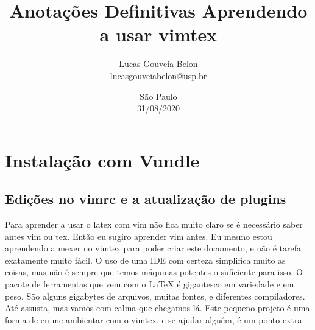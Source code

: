 \documentclass[a4paper, 12pt]{article}
\begin{document}
\title{
    \textbf{
    Anotações Definitivas
    }
    \break
    Aprendendo a usar vimtex
}
\author{
    Lucas Gouveia Belon
    \\
    lucasgouveiabelon@usp.br
}

\date{\vspace{2.2cm}São Paulo\\31/08/2020}

\maketitle
\newpage
\tableofcontents
\newpage
\section{Instalação com Vundle}
\subsection{Edições no vimrc e a atualização de plugins}

Para aprender a usar o latex com vim não fica muito claro se é necessário saber antes vim ou tex. Então eu sugiro aprender vim antes. Eu mesmo estou aprendendo a mexer no vimtex para poder criar este documento, e não é tarefa exatamente muito fácil. O uso de uma IDE com certeza simplifica muito as coisas, mas não é sempre que temos máquinas potentes o suficiente para isso. O pacote de ferramentas que vem com o \LaTeX \hspace{0.5cm} é gigantesco em variedade e em peso. São alguns gigabytes de arquivos, muitas fontes, e diferentes compiladores. Até assusta, mas vamos com calma que chegamos lá. Este pequeno projeto é uma forma de eu me ambientar com o vimtex, e se ajudar alguém, é um ponto extra.
\end{document}
